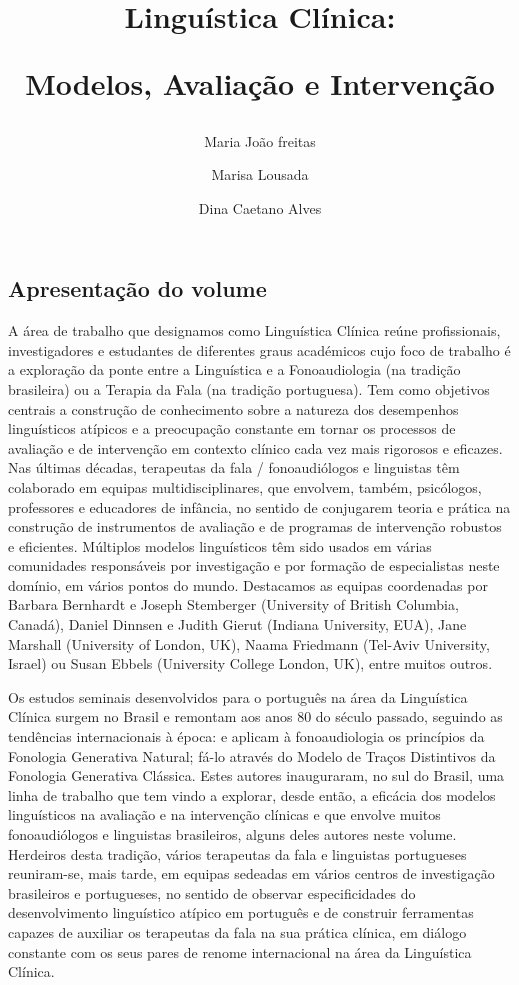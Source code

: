\begin{refsection}
\title{Linguística Clínica:


Modelos, Avaliação e Intervenção} 
\author{Maria João freitas \and Marisa Lousada \and Dina Caetano Alves}  

\maketitle
\section*{Apresentação do volume}
A área de trabalho que designamos como Linguística Clínica reúne profissionais, investigadores e estudantes de diferentes graus académicos cujo foco de trabalho é a exploração da ponte entre a Linguística e a Fonoaudiologia (na tradição brasileira) ou a Terapia da Fala (na tradição portuguesa). Tem como objetivos centrais a construção de conhecimento sobre a natureza dos desempenhos linguísticos atípicos e a preocupação constante em tornar os processos de avaliação e de intervenção em contexto clínico cada vez mais rigorosos e eficazes. Nas últimas décadas, terapeutas da fala / fonoaudiólogos e linguistas têm colaborado em equipas multidisciplinares, que envolvem, também, psicólogos, professores e educadores de infância, no sentido de conjugarem teoria e prática na construção de instrumentos de avaliação e de programas de intervenção robustos e eficientes. Múltiplos modelos linguísticos têm sido usados em várias comunidades responsáveis por investigação e por formação de especialistas neste domínio, em vários pontos do mundo. Destacamos as equipas coordenadas por Barbara Bernhardt e Joseph Stemberger (University of British Columbia, Canadá), Daniel Dinnsen e Judith Gierut (Indiana University, EUA), Jane Marshall (University of London, UK), Naama Friedmann (Tel-Aviv University, Israel) ou Susan Ebbels (University College London, UK), entre muitos outros.

Os estudos seminais desenvolvidos para o português na área da Linguística Clínica surgem no Brasil e remontam aos anos 80 do século passado, seguindo as tendências internacionais à época: \citet{Lamprecht1986} e \citet{Yavas1988} aplicam à fonoaudiologia os princípios da Fonologia Generativa Natural; \citet{MatzenauerHernandorena1988} fá-lo através do Modelo de Traços Distintivos da Fonologia Generativa Clássica. Estes autores inauguraram, no sul do Brasil, uma linha de trabalho que tem vindo a explorar, desde então, a eficácia dos modelos linguísticos na avaliação e na intervenção clínicas e que envolve muitos fonoaudiólogos e linguistas brasileiros, alguns deles autores neste volume. Herdeiros desta tradição, vários terapeutas da fala e linguistas portugueses reu\-niram-se, mais tarde, em equipas sedeadas em vários centros de investigação brasileiros e portugueses, no sentido de observar especificidades do desenvolvimento linguístico atípico em português e de construir ferramentas capazes de auxiliar os terapeutas da fala na sua prática clínica, em diálogo constante com os seus pares de renome internacional na área da Linguística Clínica.


\end{refsection}
